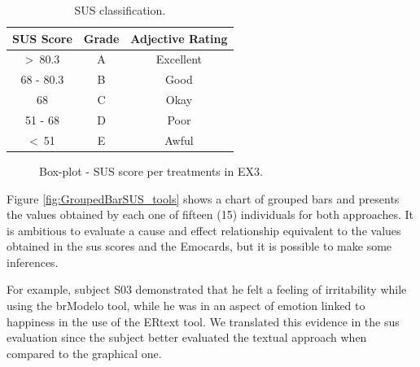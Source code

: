 \begin{table}[!htb]
\centering
\scriptsize
\caption{SUS classification.}
\label{tab:GradesSUS}
\begin{tabular}{ccc}
\bottomrule
\rowcolor[HTML]{C0C0C0}
\textbf{SUS Score} & \textbf{Grade} & \textbf{Adjective Rating} \\ \hline
\textgreater~80.3 & \cellcolor[HTML]{34A853}A & Excellent \\
68 - 80.3 & \cellcolor[HTML]{93C47D}B & Good \\
68 & \cellcolor[HTML]{FFFF00}C & Okay \\
51 - 68 & \cellcolor[HTML]{FBBC04}D & Poor \\
\textless~51 & \cellcolor[HTML]{EA4335}E & Awful \\
\toprule
\end{tabular}
\end{table}

\begin{figure}[!htb]
    \centering
    \caption{Box-plot - SUS score per treatments in EX3.}
    \label{fig:BoxPlotSUS_tools}
    
\end{figure}

Figure \ref{fig:GroupedBarSUS_tools} shows a chart of grouped bars and presents the values obtained by each one of fifteen (15) individuals for both approaches.
It is ambitious to evaluate a cause and effect relationship equivalent to the values obtained in the \ac{sus} scores and the Emocards, but it is possible to make some inferences.

For example, subject S03 demonstrated that he felt a feeling of irritability while using the brModelo tool, while he was in an aspect of emotion linked to happiness in the use of the ERtext tool. 
We translated this evidence in the \ac{sus} evaluation since the subject better evaluated the textual approach when compared to the graphical one.

